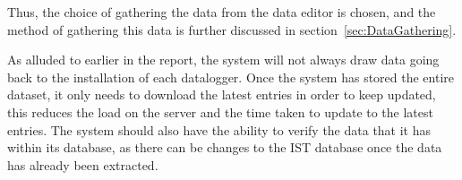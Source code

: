 \documentclass[12pt,onecolumn]{IEEEtran}
\begin{document}
Thus, the choice of gathering the data from the data editor is chosen, and the method of gathering this data is further discussed in section~\ref{sec:DataGathering}.

As alluded to earlier in the report, the system will not always draw data going back to the installation of each datalogger. Once the system has stored the entire dataset, it only needs to download the latest entries in order to keep updated, this reduces the load on the server and the time taken to update to the latest entries. 
The system should also have the ability to verify the data that it has within its database, as there can be changes to the IST database once the data has already been extracted.









\end{document}
